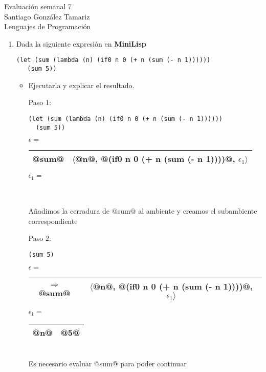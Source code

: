 \documentclass{article}
\begin{document}
  \begin{center}
    {\Large Evaluación semanal 7}\\
    {Santiago González Tamariz}\\
    {\small Lenguajes de Programación}
  \end{center}

  \begin{enumerate}
    \item Dada la siguiente expresión en \textbf{MiniLisp}
      \begin{lstlisting}
(let (sum (lambda (n) (if0 n 0 (+ n (sum (- n 1))))))
   (sum 5))
      \end{lstlisting}
      \begin{itemize}
        \item Ejecutarla y explicar el resultado.

          Paso 1:
          \begin{lstlisting}
(let (sum (lambda (n) (if0 n 0 (+ n (sum (- n 1))))))
  (sum 5))
          \end{lstlisting}
          $\epsilon = $ \begin{tabular}{|c|c|}
            @sum@ & $\langle$@n@, @(if0 n 0 (+ n (sum (- n 1))))@, $\epsilon_1\rangle$\\
            \hline
          \end{tabular}
          \hspace{0.5cm} $\epsilon_1 = $ \begin{tabular}{|c|c|}
             & \\
            \hline
          \end{tabular}\\
          Añadimos la cerradura de @sum@ al ambiente y creamos el subambiente correspondiente

          Paso 2:
          \begin{lstlisting}
(sum 5)
          \end{lstlisting}
          $\epsilon = $ \begin{tabular}{|c|c|}
            $\Rightarrow$@sum@ & $\langle$@n@, @(if0 n 0 (+ n (sum (- n 1))))@, $\epsilon_1\rangle$\\
            \hline
          \end{tabular}
          \hspace{0.5cm} $\epsilon_1 = $ \begin{tabular}{|c|c|}
             @n@ & @5@ \\
            \hline
          \end{tabular}\\
          Es necesario evaluar @sum@ para poder continuar


\end{itemize}
\end{enumerate}
\end{document}
